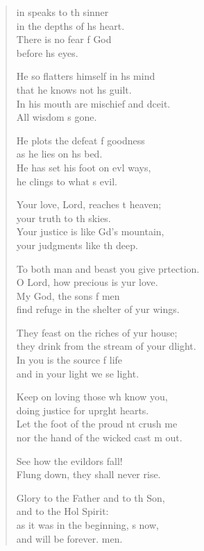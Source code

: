 \begin{verse}
  \begin{patverse}
    in speaks to th sinner\Med\\
in the depths of h\pointup{\i}s heart.\\
There is no fear f God\Med\\
before h\pointup{\i}s eyes.

He so flatters himself in h\pointup{\i}s mind\Med\\
that he knows not h\pointup{\i}s guilt.\\
In his mouth are mischief and dceit.\Med\\
All wisdom \pointup{\i}s gone.

He plots the defeat f goodness\Med\\
as he lies on h\pointup{\i}s bed.\\
He has set his foot on ev\pointup{\i}l ways,\Med\\
he clings to what \pointup{\i}s evil.

Your love, Lord, reaches t heaven;\Med\\
your truth to th skies.\\
Your justice is like Gd’s mountain,\Med\\
your judgments like th deep.

To both man and beast you give prtection.\Med\\
O Lord, how precious is yur love.\\
My God, the sons f men\Med\\
find refuge in the shelter of yur wings.

They feast on the riches of yur house;\Med\\
they drink from the stream of your dlight.\\
In you is the source f life\Med\\
and in your light we se light.

Keep on loving those wh know you,\Med\\
doing justice for upr\pointup{\i}ght hearts.\\
Let the foot of the proud nt crush me\Med\\
nor the hand of the wicked cast m out.

See how the evildors fall!\Med\\
Flung down, they shall never rise.

Glory to the Father and to th Son,\Med\\
and to the Hol Spirit:\\
as it was in the beginning, \pointup{\i}s now,\Med\\
and will be forever. men. 
  \end{patverse}
\end{verse}
